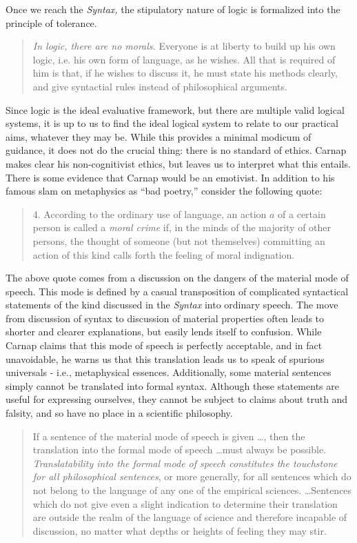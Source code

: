 \documentclass[leqno, 12pt]{turabian-researchpaper}
\begin{document}
	Once we reach the \textit{Syntax,} the stipulatory nature of logic is formalized
	into the principle of tolerance.
	\blockquote[{}]{\emph{In logic, there are no morals.} Everyone is at liberty to build up his own logic, i.e. his own form of language, as he wishes. All that is required of him is that, if he wishes to discuss it, he must state his methods clearly, and give syntactial rules instead of philosophical arguments.}
	Since logic is the ideal evaluative framework, but there are multiple valid logical
	systems, it is up to us to find the ideal logical system to relate to our
	practical aims, whatever they may be. While this provides a minimal modicum of
	guidance, it does not do the crucial thing: there is no standard of ethics. Carnap
	makes clear his non-cognitivist ethics, but leaves us to interpret what this
	entails. There is some evidence that Carnap would be an emotivist. In addition
	to his famous slam on metaphysics as \enquote{bad poetry,} consider the following
	quote: \blockquote[{}]{4. According to the ordinary use of language, an action $a$ of a certain person is called a \textit{moral crime} if, in the minds of the majority of other persons, the thought of someone (but not themselves) committing an action of this kind calls forth the feeling of moral indignation.}

	The above quote comes from a discussion on the dangers of the material mode of
	speech. This mode is defined by a casual transposition of complicated
	syntactical statements of the kind discussed in the \textit{Syntax} into ordinary
	speech. The move from discussion of syntax to discussion of material
	properties often leads to shorter and clearer explanations, but easily lends itself
	to confusion. While Carnap claims that this mode of speech is perfectly
	acceptable, and in fact unavoidable, he warns us that this translation leads
	us to speak of spurious universals - i.e., metaphysical essences. Additionally,
	some material sentences simply cannot be translated into formal syntax. Although
	these statements are useful for expressing ourselves, they cannot be subject
	to claims about truth and falsity, and so have no place in a scientific philosophy.

	\blockquote[{}]{If a sentence of the material mode of speech is given \dots, then the translation into the formal mode of speech \dots must always be possible. \emph{Translatability into the formal mode of speech constitutes the touchstone for all philosophical sentences}, or more generally, for all sentences which do not belong to the language of any one of the empirical sciences. \dots Sentences which do not give even a slight indication to determine their translation are outside the realm of the language of science and therefore incapable of discussion, no matter what depths or heights of feeling they may stir. }
\end{document}
